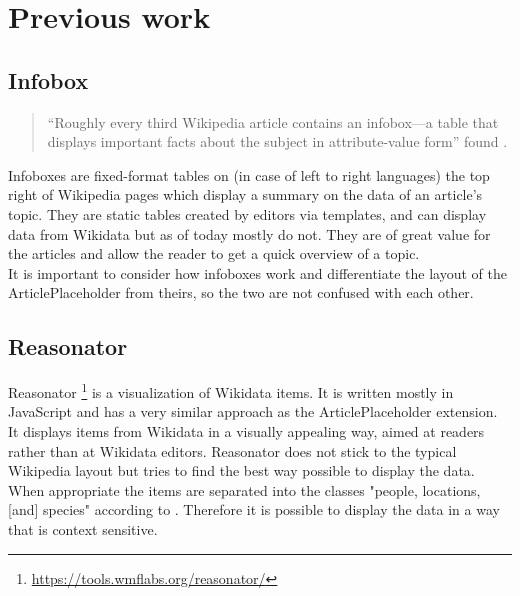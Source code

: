 \chapter{Previous work}
\section{Infobox} \label{infobox}
\begin{quote}
	``Roughly every third Wikipedia article contains an infobox---a table that displays important facts about the subject in attribute-value form'' found \citet[5]{infobox}.
\end{quote}
Infoboxes are fixed-format tables on (in case of left to right languages) the top right of Wikipedia pages which display a summary on the data of an article's topic. \citep{wiki:05} They are static tables created by editors via templates, and can display data from Wikidata but as of today mostly do not. They are of great value for the articles and allow the reader to get a quick overview of a topic. \\
It is important to consider how infoboxes work and differentiate the layout of the ArticlePlaceholder from theirs, so the two are not confused with each other.

\section{Reasonator}
Reasonator \footnote{\url{https://tools.wmflabs.org/reasonator/}} is a visualization of Wikidata items. It is written mostly in JavaScript and has a very similar approach as the ArticlePlaceholder extension. It displays items from Wikidata in a visually appealing way, aimed at readers rather than at Wikidata editors. Reasonator does not stick to the typical Wikipedia layout but tries to find the best way possible to display the data. \\
When appropriate the items are separated into the classes  "people, locations, [and] species" according to \citet{wiki:06}. Therefore it is possible to display the data in a way that is context sensitive. \\

